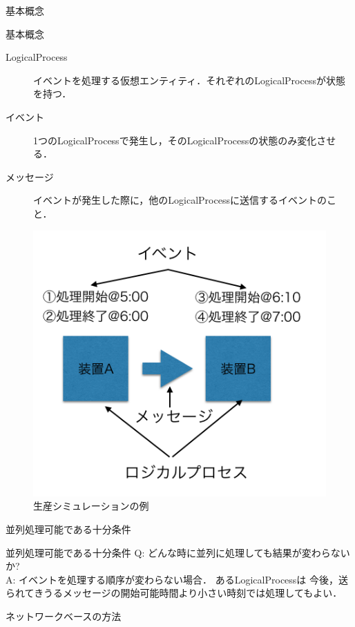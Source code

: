 \documentclass[dvipdfmx,uplatex,11pt]{beamer}
\theoremstyle{definition}
\begin{document}
\begin{frame}{基本概念}
  \begin{block}{基本概念}
    \small
    \begin{description}
      \item[LogicalProcess] イベントを処理する仮想エンティティ．それぞれのLogicalProcessが状態を持つ．
      \item[イベント] 1つのLogicalProcessで発生し，そのLogicalProcessの状態のみ変化させる．
      \item[メッセージ] イベントが発生した際に，他のLogicalProcessに送信するイベントのこと．
    \end{description}
  \end{block}
  \begin{figure}
    \includegraphics[scale=0.2]{basic_idea.png}
    \caption{生産シミュレーションの例}
  \end{figure}
\end{frame}


\begin{frame}{並列処理可能である十分条件}
  \begin{block}{並列処理可能である十分条件}
  Q: どんな時に並列に処理しても結果が変わらないか? \\
  A: イベントを処理する順序が変わらない場合．
     あるLogicalProcessは
     今後，送られてきうるメッセージの開始可能時間より小さい時刻では処理してもよい．
  \end{block}
\end{frame}

\begin{frame}{ネットワークベースの方法}
\end{frame}
\end{document}
